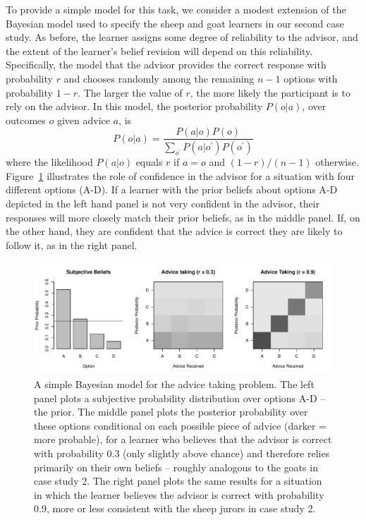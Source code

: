 \documentclass[doc]{apa6}
\begin{document}
To provide a simple model for this task, we consider a modest extension of the Bayesian model used to specify the {\sc sheep} and {\sc goat} learners in our second case study. As before, the learner assigns some degree of reliability to the advisor, and the extent of the learner's belief revision will depend on this reliability. Specifically, the model that the advisor provides the correct response with probability $r$ and chooses randomly among the remaining $n-1$ options with probability $1-r$. The larger the value of $r$, the more likely the participant is to rely on the advisor. In this model, the posterior probability $P(o|a)$, over outcomes $o$ given advice $a$, is
$$
P(o|a) = \frac{P(a|o) P(o)}{\sum_{o^\prime} P(a|o^\prime) P(o^\prime)}
$$
where the likelihood $P(a|o)$ equals $r$ if $a=o$ and $(1-r)/(n-1)$ otherwise. Figure~\ref{advice} illustrates the role of confidence in the advisor for a situation with four different options (A-D). If a learner with the prior beliefs about options A-D depicted in the left hand panel is not very confident in the advisor, their responses will more closely match their prior beliefs, as in the middle panel. If, on the other hand, they are confident that the advice is correct they are likely to follow it, as in the right panel.

\begin{figure}[t]
\begin{center}
\includegraphics[width=13cm]{advice.pdf}
\caption{\small{A simple Bayesian model for the advice taking problem. The left panel plots a subjective probability distribution over options A-D -- the prior. The middle panel plots the posterior probability over these options conditional on each possible piece of advice (darker = more probable), for a learner who believes that the advisor is correct with probability 0.3 (only slightly above chance) and therefore relies primarily on their own beliefs -- roughly analogous to the {\sc goats} in case study 2. The right panel plots the same results for a situation in which the learner believes the advisor is correct with probability 0.9, more or less consistent with the {\sc sheep} jurors in case study 2.}}
\label{advice}
\end{center}
\end{figure}
\end{document}
